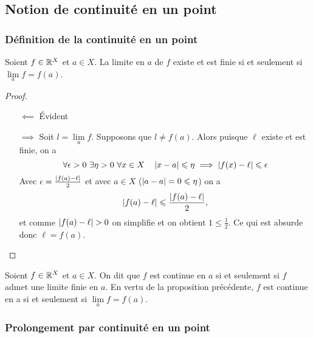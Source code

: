 \subsection{Notion de continuité en un point}

\subsubsection{Définition de la continuité en un point}

\begin{prop}
  Soient \(f \in \mathbb{R}^X\) et \(a \in X\). La limite en \(a\) de \(f\) existe et 
  est finie si et seulement si \(\lim\limits_{a} f = f(a)\).
\end{prop}
\begin{proof}
  \begin{itemize}
    \item[\(\impliedby\)] Évident
    \item[\(\implies\)] Soit \(l=\lim\limits_{a} f\). Supposons que \(l \neq 
      f(a)\). Alors puisque \(\ell\) existe et est finie, on a
      \begin{equation}
        \forall \epsilon > 0 \ \exists \eta > 0 \ \forall x \in X \quad 
        \left\lvert x-a\right\rvert \leqslant \eta \implies \left\lvert f(x)-\ell\right\rvert \leqslant \epsilon
      \end{equation}
      Avec \(\epsilon=\frac{\left\lvert f(a)-\ell\right\rvert}{2}\) et avec \(a \in X\) 
      (\(\left\lvert a-a\right\rvert=0 \leqslant \eta\)) on a
      \begin{equation}
        \left\lvert f(a)-\ell\right\rvert \leqslant \frac{\left\lvert f(a)-\ell\right\rvert}{2},
      \end{equation}
      et comme \(\left\lvert f(a)-\ell\right\rvert > 0\) on simplifie et on obtient \(1 \leqslant 
      \frac{1}{2}\). Ce qui est absurde donc \(\ell=f(a)\).
  \end{itemize}
\end{proof}
\begin{defdef}
  Soient \(f \in \mathbb{R}^X\) et \(a \in X\). On dit que \(f\) est continue en \(a\) 
  si et seulement si \(f\) admet une limite finie en \(a\). En vertu de la 
  proposition précédente, \(f\) est continue en a si et seulement si 
  \(\lim\limits_{a} f = f(a)\).
\end{defdef}

\subsubsection{Prolongement par continuité en un point}


